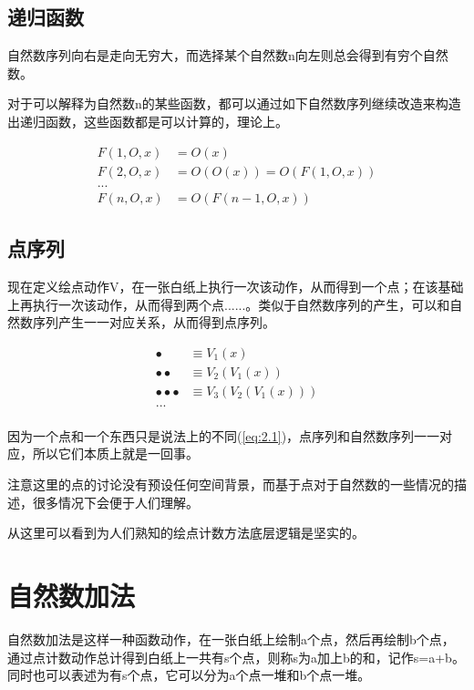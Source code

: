 \documentclass[12pt,oneside]{book}
\begin{document}
\subsection{递归函数}
自然数序列向右是走向无穷大，而选择某个自然数n向左则总会得到有穷个自然数。

对于可以解释为自然数n的某些函数，都可以通过如下自然数序列继续改造来构造出递归函数，这些函数都是可以计算的，理论上。

\begin{align*}
F(1, O, x) &= O(x)\\
F(2, O, x) &= O(O(x)) = O(F(1, O, x))\\
...\\
F(n, O, x) &= O(F(n-1, O, x))
\end{align*}




\subsection{点序列}
现在定义绘点动作V，在一张白纸上执行一次该动作，从而得到一个点；在该基础上再执行一次该动作，从而得到两个点......。类似于自然数序列的产生，可以和自然数序列产生一一对应关系，从而得到点序列。


\begin{align*}
\bullet &\equiv V_1(x) \\
\bullet \bullet&\equiv V_2(V_1(x)) \\
\bullet \bullet \bullet &\equiv V_3(V_2(V_1(x))) \\
...\\
\end{align*}

因为一个点和一个东西只是说法上的不同(\ref{eq:2.1})，点序列和自然数序列一一对应，所以它们本质上就是一回事。

注意这里的点的讨论没有预设任何空间背景，而基于点对于自然数的一些情况的描述，很多情况下会便于人们理解。

从这里可以看到为人们熟知的绘点计数方法底层逻辑是坚实的。



\section{自然数加法}
自然数加法是这样一种函数动作，在一张白纸上绘制a个点，然后再绘制b个点，通过点计数动作总计得到白纸上一共有s个点，则称s为a加上b的和，记作s=a+b。同时也可以表述为有s个点，它可以分为a个点一堆和b个点一堆。
\end{document}
